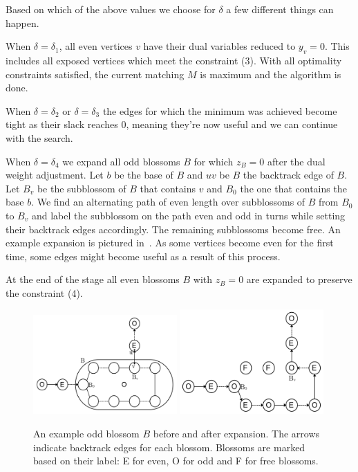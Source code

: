 Based on which of the above values we choose for $\delta$ a few different things can happen.

When $\delta = \delta_1$, all even vertices $v$ have their dual variables reduced to $y_v = 0$. This includes all exposed vertices which meet the constraint (3). With all optimality constraints satisfied, the current matching $M$ is maximum and the algorithm is done.

When $\delta = \delta_2$ or $\delta = \delta_3$ the edges for which the minimum was achieved become tight as their slack reaches $0$, meaning they're now useful and we can continue with the search.

When $\delta = \delta_4$ we expand all odd blossoms $B$ for which $z_B = 0$ after the dual weight adjustment. Let $b$ be the base of $B$ and $uv$ be $B$ the backtrack edge of $B$. Let $B_v$ be the subblossom of $B$ that contains $v$ and $B_0$ the one that contains the base $b$. We find an alternating path of even length over subblossoms of $B$ from $B_0$ to $B_v$ and label the subblossom on the path even and odd in turns while setting their backtrack edges accordingly. The remaining subblossoms become free. An example expansion is pictured in~. As some vertices become even for the first time, some edges might become useful as a result of this process.

At the end of the stage all even blossoms $B$ with $z_B = 0$ are expanded to preserve the constraint (4).

\begin{figure}
    \centering
    \includegraphics*[width=0.49\textwidth]{figures/Odd expansion.png}
    \includegraphics*[width=0.49\textwidth]{figures/Odd expanded.png}
    \caption{An example odd blossom $B$ before and after expansion. The arrows indicate backtrack edges for each blossom. Blossoms are marked based on their label: E for even, O for odd and F for free blossoms.}
\end{figure}

